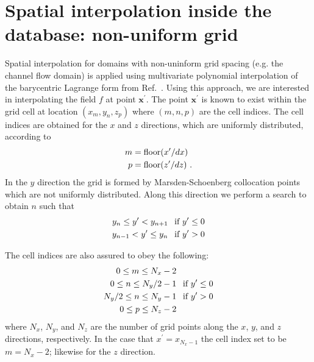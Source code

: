 \documentclass[11pt]{article}
\begin{document}
\section{Spatial interpolation inside the database: non-uniform grid}\label{sec:interp}
Spatial interpolation for domains with non-uninform grid spacing (e.g. the
channel flow domain) is applied using multivariate polynomial interpolation of
the barycentric Lagrange form from Ref.~\cite{Berrut2004}. Using this approach,
we are interested in interpolating the field $f$ at point $\bm{x}^\prime$. The
point $\bm{x}^\prime$ is known to exist within the grid cell at location
$(x_m,y_n,z_p)$ where $(m,n,p)$ are the cell indices. The cell indices are
obtained for the $x$ and $z$ directions, which are uniformly distributed,
according to
\begin{align}
  m &= \text{floor}( x^\prime / dx ) \\
  p &= \text{floor}( z^\prime / dz ) \mbox{ .} \notag
\end{align}
In the $y$ direction the grid is formed by Marsden-Schoenberg collocation points
which are not uniformly distributed. Along this direction we perform a search to obtain $n$ such that 
\begin{align}
  y_n  \leq y^\prime < y_{n+1} &\text{\hspace{1ex} if } y^\prime \leq 0 \\
  y_{n-1} < y^\prime \leq y_n &\text{\hspace{1ex} if } y^\prime > 0 \notag
\end{align}

The cell indices are also assured to obey the following:
\begin{align}
  0 \leq m \leq N_x - 2 & \notag \\
  0 \leq n \leq N_y/2 - 1 &\text{\hspace{1ex} if } y^\prime \leq 0 \\
  N_y/2 \leq n \leq N_y - 1 &\text{\hspace{1ex} if } y^\prime > 0 \notag \\
  0 \leq p \leq N_z - 2 &\notag
\end{align}
where $N_x$, $N_y$, and $N_z$ are the number of grid points along the $x$, $y$, and
$z$ directions, respectively. In the case that $x^\prime = x_{N_x-1}$ the cell index set to be $m=N_x-2$; likewise for the $z$ direction.
 
\end{document}

